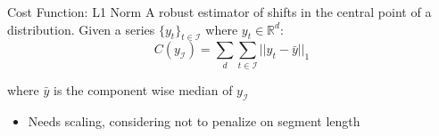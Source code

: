 \documentclass{beamer}
\begin{document}
        \begin{frame}{Cost Function: L1 Norm}
            A robust estimator of shifts in the central point of a distribution. Given a series $\{y_t\}_{t \in \mathcal{I}}$ where  $y_t \in \mathbb{R}^d$:
            \begin{equation}
                C(y_{\mathcal{I}}) = \sum_{d} \sum_{t \in \mathcal{I}} ||y_t - \bar{y} ||_1
            \end{equation}

            where $\bar{y}$ is the component wise median of $y_{\mathcal{I}}$

            \begin{itemize}
                \item Needs scaling, considering not to penalize on segment length
            \end{itemize}

        \end{frame}



\end{document}
